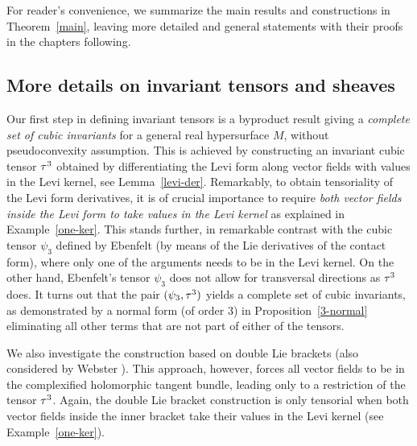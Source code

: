 \documentclass[12pt]{amsart}
\begin{document}
For reader's convenience,
we summarize the main results and constructions
in Theorem~\ref{main},
leaving more detailed and general statements
with their proofs in the chapters following.



\subsection{More details on invariant tensors and sheaves}
Our first step in defining invariant tensors is a byproduct result 
giving a {\em complete set of cubic invariants}
for a general real hypersurface $M$, without pseudoconvexity assumption.
This is achieved by constructing an invariant cubic tensor $\tau^3$
obtained by differentiating the Levi form along vector fields
with values in the Levi kernel, see Lemma~\ref{levi-der}.
Remarkably, to obtain tensoriality of the Levi form derivatives, 
it is of crucial importance to require
{\em both vector fields inside the Levi form to take values in the Levi kernel}
as explained in Example~\ref{one-ker}.
This stands further, in remarkable contrast with the cubic tensor $\psi_3$
defined by Ebenfelt \cite{E-jdg}
(by means of the Lie derivatives of the contact form),
where only one of the arguments needs to be in the Levi kernel.
%
On the other hand, Ebenfelt's tensor $\psi_3$
does not allow for transversal directions as $\tau^3$ does.
It turns out that the pair $(\psi_3, \tau^3)$ yields
a complete set of cubic invariants, 
as demonstrated by a normal form 
(of order $3$)
in Proposition~\ref{3-normal} eliminating all other terms
that are not part of either of the tensors.

We also investigate the construction based on double Lie brackets
(also considered by Webster \cite{W}).
This approach, however, forces all vector fields
to be in the complexified holomorphic tangent bundle,
leading only to a restriction of the tensor $\tau^3$.
Again, the double Lie bracket construction
is only tensorial when both vector fields inside the inner bracket
take their values in the Levi kernel (see Example~\ref{one-ker}).
\end{document}
